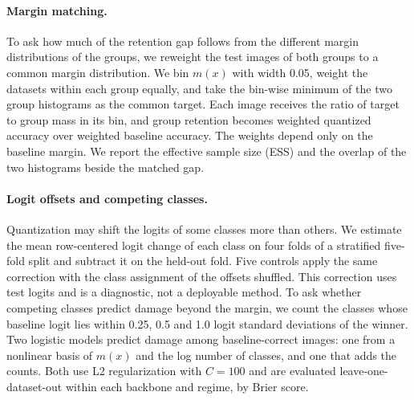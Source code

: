\paragraph{Margin matching.}
To ask how much of the retention gap follows from the different margin distributions of the groups, we reweight the test images of both groups to a common margin distribution.
We bin $m(x)$ with width 0.05, weight the datasets within each group equally, and take the bin-wise minimum of the two group histograms as the common target.
Each image receives the ratio of target to group mass in its bin, and group retention becomes weighted quantized accuracy over weighted baseline accuracy.
The weights depend only on the baseline margin.
We report the effective sample size (ESS) and the overlap of the two histograms beside the matched gap.

\paragraph{Logit offsets and competing classes.}
Quantization may shift the logits of some classes more than others.
We estimate the mean row-centered logit change of each class on four folds of a stratified five-fold split and subtract it on the held-out fold.
Five controls apply the same correction with the class assignment of the offsets shuffled.
This correction uses test logits and is a diagnostic, not a deployable method.
To ask whether competing classes predict damage beyond the margin, we count the classes whose baseline logit lies within 0.25, 0.5 and 1.0 logit standard deviations of the winner.
Two logistic models predict damage among baseline-correct images: one from a nonlinear basis of $m(x)$ and the log number of classes, and one that adds the counts.
Both use L2 regularization with $C=100$ and are evaluated leave-one-dataset-out within each backbone and regime, by Brier score.
